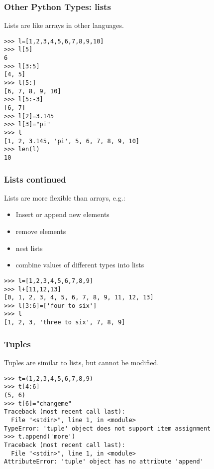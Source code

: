 \documentclass[10pt]{beamer}
\begin{document}
\begin{frame}[fragile]
\frametitle{Other Python Types: lists}

Lists are like arrays in other languages.  
\begin{verbatim}
>>> l=[1,2,3,4,5,6,7,8,9,10]
>>> l[5]
6
>>> l[3:5]
[4, 5]
>>> l[5:]
[6, 7, 8, 9, 10]
>>> l[5:-3]
[6, 7]
>>> l[2]=3.145
>>> l[3]="pi"
>>> l
[1, 2, 3.145, 'pi', 5, 6, 7, 8, 9, 10]
>>> len(l)
10
\end{verbatim}

\end{frame}

\begin{frame}[fragile]
\frametitle{Lists continued}

Lists are more flexible than arrays, e.g.:
\begin{itemize}
\item Insert or append new elements
\item remove elements
\item nest lists
\item combine values of different types into lists
\end{itemize}

\begin{verbatim}
>>> l=[1,2,3,4,5,6,7,8,9]
>>> l+[11,12,13]
[0, 1, 2, 3, 4, 5, 6, 7, 8, 9, 11, 12, 13]
>>> l[3:6]=['four to six']
>>> l
[1, 2, 3, 'three to six', 7, 8, 9]
\end{verbatim}

\end{frame}

\begin{frame}[fragile]
\frametitle{Tuples}

Tuples are similar to lists, but cannot be modified.
\begin{verbatim}
>>> t=(1,2,3,4,5,6,7,8,9)
>>> t[4:6]
(5, 6)
>>> t[6]="changeme"
Traceback (most recent call last):
  File "<stdin>", line 1, in <module>
TypeError: 'tuple' object does not support item assignment
>>> t.append('more')
Traceback (most recent call last):
  File "<stdin>", line 1, in <module>
AttributeError: 'tuple' object has no attribute 'append'
\end{verbatim}
\end{frame}
\end{document}
